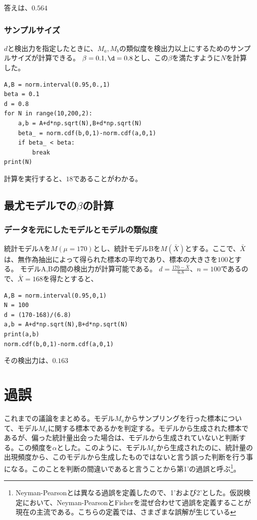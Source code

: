 答えは、$0.564$


\subsubsection{サンプルサイズ}
$d$と検出力を指定したときに、$M_a,M_b$の類似度を検出力以上にするためのサンプルサイズが計算できる。
$\beta=0.1,\d=0.8$とし、この$\beta$を満たすように$N$を計算した。

\begin{lstlisting}
A,B = norm.interval(0.95,0.,1)
beta = 0.1
d = 0.8
for N in range(10,200,2):
    a,b = A+d*np.sqrt(N),B+d*np.sqrt(N)
    beta_ = norm.cdf(b,0,1)-norm.cdf(a,0,1)
    if beta_ < beta:
        break
print(N)
\end{lstlisting}
計算を実行すると、$18$であることがわかる。



\subsection{最尤モデルでの$\beta$の計算}
\subsubsection{データを元にしたモデルとモデルの類似度}
統計モデルAを$M(\mu=170)$とし、統計モデルBを$M(\bar{X})$とする。ここで、$\bar{X}$は、無作為抽出によって得られた標本の平均であり、標本の大きさを$100$とする。
モデルA,Bの間の検出力が計算可能である。
$d=\frac{170-\bar{X}}{6.8}$、$n=100$であるので、$\bar{X}=168$を得たとすると、
\begin{lstlisting}
A,B = norm.interval(0.95,0,1)
N = 100
d = (170-168)/(6.8)
a,b = A+d*np.sqrt(N),B+d*np.sqrt(N)
print(a,b)
norm.cdf(b,0,1)-norm.cdf(a,0,1)
\end{lstlisting}
その検出力は、$0.163$


\section{過誤}
これまでの議論をまとめる。モデル$M_a$からサンプリングを行った標本について、モデル$M_a$に関する標本であるかを判定する。モデルから生成された標本であるが、偏った統計量出会った場合は、モデルから生成されていないと判断する。この頻度を$\alpha$とした。このように、モデル$M_a$から生成されたのに、統計量の出現頻度から、このモデルから生成したものではないと言う誤った判断を行う事になる。このことを判断の間違いであると言うことから第1'の過誤と呼ぶ\footnote{Neyman-Pearsonとは異なる過誤を定義したので、1'および2'とした。仮説検定において、Neyman-PearsonとFisherを混ぜ合わせて過誤を定義することが現在の主流である。こちらの定義では、さまざまな誤解が生じている\cite{1573106361610039296}}。


